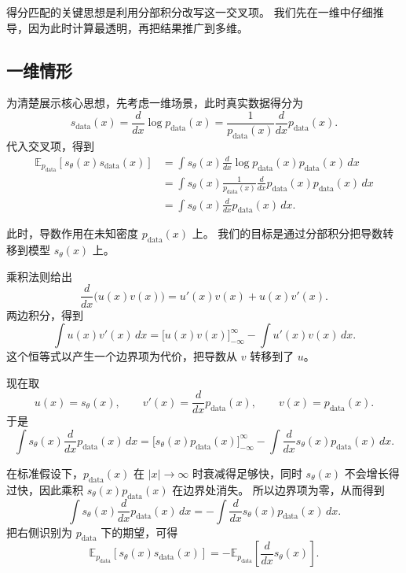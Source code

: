 得分匹配的关键思想是利用分部积分改写这一交叉项。
我们先在一维中仔细推导，因为此时计算最透明，再把结果推广到多维。

\subsection{一维情形}

为清楚展示核心思想，先考虑一维场景，此时真实数据得分为
\[
s_{\text{data}}(x)
=
\frac{d}{dx}\log p_{\text{data}}(x)
=
\frac{1}{p_{\text{data}}(x)}
\frac{d}{dx}p_{\text{data}}(x).
\]
代入交叉项，得到
\[
\begin{aligned}
\mathbb{E}_{p_{\text{data}}}
\left[
s_\theta(x)s_{\text{data}}(x)
\right]
&=
\int
s_\theta(x)
\frac{d}{dx}\log p_{\text{data}}(x)
p_{\text{data}}(x)
\,dx \\[4pt]
&=
\int
s_\theta(x)
\frac{1}{p_{\text{data}}(x)}
\frac{d}{dx}p_{\text{data}}(x)
p_{\text{data}}(x)
\,dx \\[4pt]
&=
\int
s_\theta(x)
\frac{d}{dx}p_{\text{data}}(x)
\,dx.
\end{aligned}
\]

此时，导数作用在未知密度 $p_{\text{data}}(x)$ 上。
我们的目标是通过分部积分把导数转移到模型 $s_\theta(x)$ 上。

\begin{tcolorbox}[
  colback=blue!4,
  colframe=blue!50!black,
  title={一维分部积分},
  boxrule=0.6pt,
  arc=2mm,
  left=2mm,
  right=2mm,
  top=1mm,
  bottom=1mm
]
乘积法则给出
\[
\frac{d}{dx}\bigl(u(x)v(x)\bigr)
=
u'(x)v(x)+u(x)v'(x).
\]
两边积分，得到
\[
\int u(x)v'(x)\,dx
=
\bigl[u(x)v(x)\bigr]_{-\infty}^{\infty}
-
\int u'(x)v(x)\,dx.
\]
这个恒等式以产生一个边界项为代价，把导数从 $v$ 转移到了 $u$。
\end{tcolorbox}

现在取
\[
u(x)=s_\theta(x),
\qquad
v'(x)=\frac{d}{dx}p_{\text{data}}(x),
\qquad
v(x)=p_{\text{data}}(x).
\]
于是
\[
\int
s_\theta(x)
\frac{d}{dx}p_{\text{data}}(x)
\,dx
=
\bigl[
s_\theta(x)p_{\text{data}}(x)
\bigr]_{-\infty}^{\infty}
-
\int
\frac{d}{dx}s_\theta(x)
p_{\text{data}}(x)
\,dx.
\]

在标准假设下，$p_{\text{data}}(x)$ 在 $|x|\to\infty$ 时衰减得足够快，同时 $s_\theta(x)$ 不会增长得过快，因此乘积 $s_\theta(x)p_{\text{data}}(x)$ 在边界处消失。
所以边界项为零，从而得到
\[
\int
s_\theta(x)
\frac{d}{dx}p_{\text{data}}(x)
\,dx
=
-
\int
\frac{d}{dx}s_\theta(x)
p_{\text{data}}(x)
\,dx.
\]
把右侧识别为 $p_{\text{data}}$ 下的期望，可得
\[
\mathbb{E}_{p_{\text{data}}}
\left[
s_\theta(x)s_{\text{data}}(x)
\right]
=
-
\mathbb{E}_{p_{\text{data}}}
\left[
\frac{d}{dx}s_\theta(x)
\right].
\]


